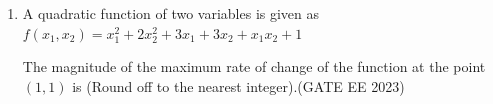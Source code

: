 \documentclass[a4paper,12pt]{exam}
\theoremstyle{remark}
\begin{document}
\begin{enumerate}
\item A quadratic function of two variables is given as
$
f(x_1, x_2) = x_1^2 + 2x_2^2 + 3x_1 + 3x_2 + x_1 x_2 + 1
$

The magnitude of the maximum rate of change of the function at the point $(1,1)$ is \underline{\hspace{2.5cm}} (Round off to the nearest integer).\hfill{(GATE EE 2023)}\\
\vspace{3cm}

\end{enumerate}
\end{document}

